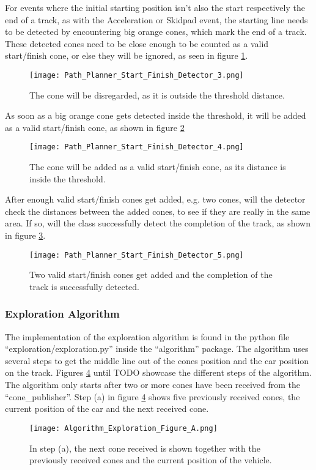 For events where the initial starting position isn't also the start respectively the end of a track, as with the Acceleration or Skidpad event, the starting line needs to be detected by encountering big orange cones, which mark the end of a track. These detected cones need to be close enough to be counted as a valid start/finish cone, or else they will be ignored, as seen in figure \ref{fig:Path Planner Start Finish Detector 3}.
\begin{figure}[H]
    \centering
    \texttt{[image: Path\_Planner\_Start\_Finish\_Detector\_3.png]}
    \caption{The cone will be disregarded, as it is outside the threshold distance.}
    \label{fig:Path Planner Start Finish Detector 3}
\end{figure}
As soon as a big orange cone gets detected inside the threshold, it will be added as a valid start/finish cone, as shown in figure \ref{fig:Path Planner Start Finish Detector 4}
\begin{figure}[H]
    \centering
    \texttt{[image: Path\_Planner\_Start\_Finish\_Detector\_4.png]}
    \caption{The cone will be added as a valid start/finish cone, as its distance is inside the threshold.}
    \label{fig:Path Planner Start Finish Detector 4}
\end{figure}
After enough valid start/finish cones get added, e.g. two cones, will the detector check the distances between the added cones, to see if they are really in the same area. If so, will the class successfully detect the completion of the track, as shown in figure \ref{fig:Path Planner Start Finish Detector 5}.
\begin{figure}[H]
    \centering
    \texttt{[image: Path\_Planner\_Start\_Finish\_Detector\_5.png]}
    \caption{Two valid start/finish cones get added and the completion of the track is successfully detected.}
    \label{fig:Path Planner Start Finish Detector 5}
\end{figure}

\subsubsection{Exploration Algorithm} \label{sec:Exploration Algorithm} %
The implementation of the exploration algorithm is found in the python file ``exploration/exploration.py'' inside the ``algorithm'' package. The algorithm uses several steps to get the middle line out of the cones position and the car position on the track. Figures \ref{fig:Algorithm Exploration Figure A} until TODO showcase the different steps of the algorithm. The algorithm only starts after two or more cones have been received from the ``cone\_publisher''. Step (a) in figure \ref{fig:Algorithm Exploration Figure A} shows five previously received cones, the current position of the car and the next received cone.
\begin{figure}[H]
    \centering
    \texttt{[image: Algorithm\_Exploration\_Figure\_A.png]}
    \caption{In step (a), the next cone received is shown together with the previously received cones and the current position of the vehicle.}
    \label{fig:Algorithm Exploration Figure A}
\end{figure}

